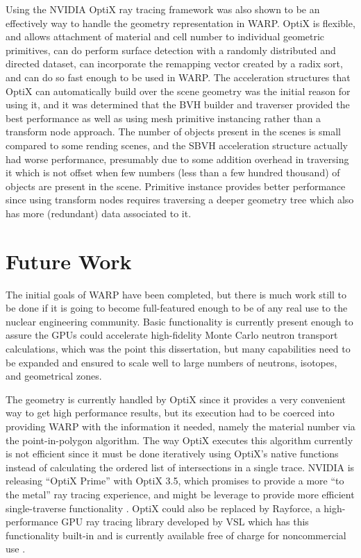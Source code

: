 Using the NVIDIA OptiX ray tracing framework was also shown to be an effectively way to handle the geometry representation in WARP.  OptiX is flexible, and allows attachment of material and cell number to individual geometric primitives, can do perform surface detection with a randomly distributed and directed dataset, can incorporate the remapping vector created by a radix sort, and can do so fast enough to be used in WARP.  The acceleration structures that OptiX can automatically build over the scene geometry was the initial reason for using it, and it was determined that the BVH builder and traverser provided the best performance as well as using mesh primitive instancing rather than a transform node approach.  The number of objects present in the scenes is small compared to some rending scenes, and the SBVH acceleration structure actually had worse performance, presumably due to some addition overhead in traversing it which is not offset when few numbers (less than a few hundred thousand) of objects are present in the scene.  Primitive instance provides better performance since using transform nodes requires traversing a deeper geometry tree which also has more (redundant) data associated to it.

\section{Future Work}

The initial goals of WARP have been completed, but there is much work still to be done if it is going to become full-featured enough to be of any real use to the nuclear engineering community.  Basic functionality is currently present enough to assure the GPUs could accelerate high-fidelity Monte Carlo neutron transport calculations, which was the point this dissertation, but many capabilities need to be expanded and ensured to scale well to large numbers of neutrons, isotopes, and geometrical zones.

The geometry is currently handled by OptiX since it provides a very convenient way to get high performance results, but its execution had to be coerced into providing WARP with the information it needed, namely the material number via the point-in-polygon algorithm.  The way OptiX executes this algorithm currently is not efficient since it must be done iteratively using OptiX's native functions instead of calculating the ordered list of intersections in a single trace.  NVIDIA is releasing ``OptiX Prime'' with OptiX 3.5, which promises to provide a more ``to the metal'' ray tracing experience, and might be leverage to provide more efficient single-traverse functionality \cite{optix3.5}.  OptiX could also be replaced by Rayforce, a high-performance GPU ray tracing library developed by VSL which has this functionality built-in and is currently available free of charge for noncommercial use \cite{rayforce}.

